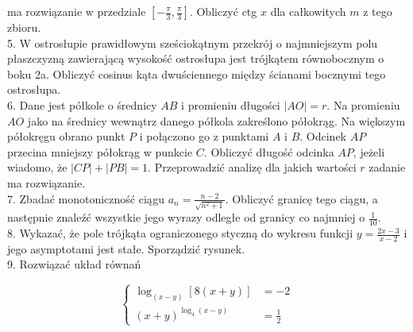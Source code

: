 \documentclass[10pt]{article}
\begin{document}
ma rozwiązanie w przedziale $\left[-\frac{\pi}{3}, \frac{\pi}{3}\right]$. Obliczyć ctg $x$ dla całkowitych $m$ z tego zbioru.\\
5. W ostrosłupie prawidłowym sześciokątnym przekrój o najmniejszym polu płaszczyzną zawierającą wysokość ostrosłupa jest trójkątem równobocznym o boku 2a. Obliczyć cosinus kąta dwuściennego między ścianami bocznymi tego ostrosłupa.\\
6. Dane jest półkole o średnicy $A B$ i promieniu długości $|A O|=r$. Na promieniu $A O$ jako na średnicy wewnątrz danego półkola zakreślono półokrąg. Na większym półokręgu obrano punkt $P$ i połączono go z punktami $A$ i $B$. Odcinek $A P$ przecina mniejszy półokrąg w punkcie $C$. Obliczyć długość odcinka $A P$, jeżeli wiadomo, że $|C P|+|P B|=1$. Przeprowadzić analizę dla jakich wartości $r$ zadanie ma rozwiązanie.\\
7. Zbadać monotoniczność ciągu $a_{n}=\frac{n-2}{\sqrt{n^{2}+1}}$. Obliczyć granicę tego ciągu, a następnie znaleźć wszystkie jego wyrazy odległe od granicy co najmniej o $\frac{1}{10}$.\\
8. Wykazać, że pole trójkąta ograniczonego styczną do wykresu funkcji $y=\frac{2 x-3}{x-2}$ i jego asymptotami jest stałe. Sporządzić rysunek.\\
9. Rozwiązać układ równań

$$
\left\{\begin{aligned}
\log _{(x-y)}[8(x+y)] & =-2 \\
(x+y)^{\log _{4}(x-y)} & =\frac{1}{2}
\end{aligned}\right.
$$
\end{document}
